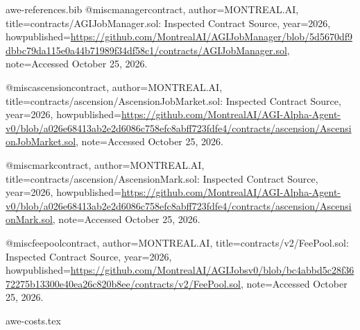 \begin{filecontents*}[overwrite]{awe-references.bib}
@misc{managercontract,
 author={{MONTREAL.AI}},
 title={contracts/AGIJobManager.sol: Inspected Contract Source},
 year={2026},
 howpublished={\url{https://github.com/MontrealAI/AGIJobManager/blob/5d5670df9dbbc79da115e0a44b71989f34df58c1/contracts/AGIJobManager.sol}},
 note={Accessed October 25, 2026.}
}

@misc{ascensioncontract,
 author={{MONTREAL.AI}},
 title={contracts/ascension/AscensionJobMarket.sol: Inspected Contract Source},
 year={2026},
 howpublished={\url{https://github.com/MontrealAI/AGI-Alpha-Agent-v0/blob/a026e68413ab2e2d6086c758efc8abff723fdfe4/contracts/ascension/AscensionJobMarket.sol}},
 note={Accessed October 25, 2026.}
}

@misc{markcontract,
 author={{MONTREAL.AI}},
 title={contracts/ascension/AscensionMark.sol: Inspected Contract Source},
 year={2026},
 howpublished={\url{https://github.com/MontrealAI/AGI-Alpha-Agent-v0/blob/a026e68413ab2e2d6086c758efc8abff723fdfe4/contracts/ascension/AscensionMark.sol}},
 note={Accessed October 25, 2026.}
}

@misc{feepoolcontract,
 author={{MONTREAL.AI}},
 title={contracts/v2/FeePool.sol: Inspected Contract Source},
 year={2026},
 howpublished={\url{https://github.com/MontrealAI/AGIJobsv0/blob/bc4abbd5c28f3672275b13300e40ea26c820b8ee/contracts/v2/FeePool.sol}},
 note={Accessed October 25, 2026.}
}

\end{filecontents*}
\begin{filecontents*}[overwrite]{awe-costs.tex}
\end{filecontents*}
